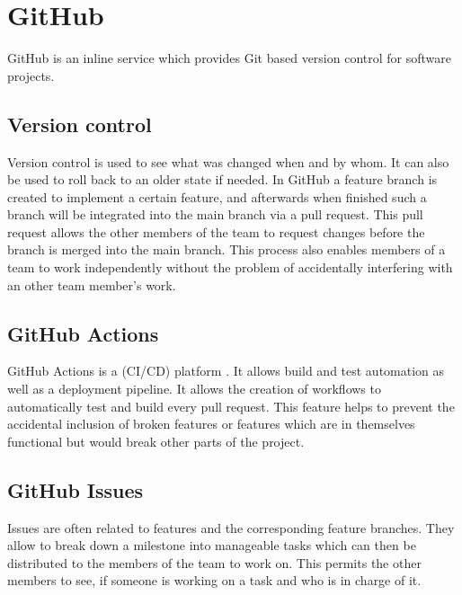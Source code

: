 \section{GitHub} \label{GitHub}
GitHub \cite{github_url} is an inline service which provides Git based version control for software projects.
\subsection{Version control}
Version control is used to see what was changed when and by whom. It can also be used to roll back to an older state if needed. In GitHub a feature branch is created to implement a certain feature, and afterwards when finished such a branch will be integrated into the main branch via a pull request. This pull request allows the other members of the team to request changes before the branch is merged into the main branch. This process also enables members of a team to work independently without the problem of accidentally interfering with an other team member's work.
\subsection{GitHub Actions}
GitHub Actions is a (CI/CD) platform \cite{github_actions_url}. It allows build and test automation as well as a deployment pipeline. It allows the creation of workflows to automatically test and build every pull request. This feature helps to prevent the accidental inclusion of broken features or features which are in themselves functional but would break other parts of the project.
\subsection{GitHub Issues}
Issues are often related to features and the corresponding feature branches. They allow to break down a milestone into manageable tasks which can then be distributed to the members of the team to work on. This permits the other members to see, if someone is working on a task and who is in charge of it. 